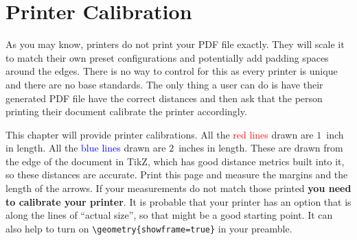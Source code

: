 \chapter{Printer Calibration}\label{chapter:printer_calibration}

As you may know, printers do not print your PDF file exactly.
They will scale it to match their own preset configurations and potentially add padding spaces around the edges.
There is no way to control for this as every printer is unique and there are no base standards.
The only thing a user can do is have their generated PDF file have the correct distances and then ask that the person printing their document calibrate the printer accordingly.

\printercalibration{}

\vspace{2in}
This chapter will provide printer calibrations.
All the \textcolor{red}{red lines} drawn are $1$~inch in length.
All the \textcolor{blue}{blue lines} drawn are $2$~inches in length.
These are drawn from the edge of the document in TikZ, which has good distance metrics built into it, so these distances are accurate.
Print this page and measure the margins and the length of the arrows.
If your measurements do not match those printed \textbf{you need to calibrate your printer}.
It is probable that your printer has an option that is along the lines of ``actual size'', so that might be a good starting point.
It can also help to turn on \verb|\geometry{showframe=true}| in your preamble.
